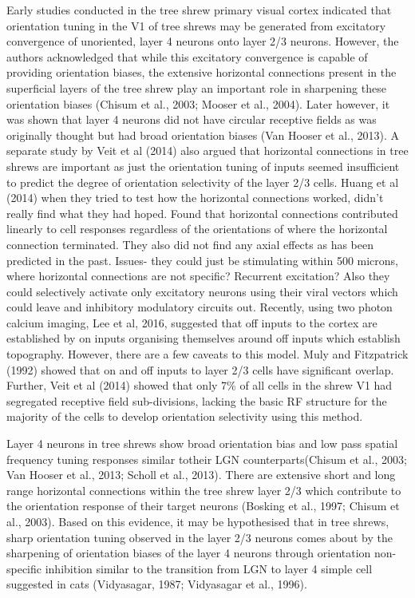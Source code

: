 Early studies conducted in the tree shrew primary visual cortex indicated that orientation tuning in the V1 of tree shrews may be generated from excitatory convergence of unoriented, layer 4 neurons onto layer 2/3 neurons. However, the authors acknowledged that while this excitatory convergence is capable of providing orientation biases, the extensive horizontal connections present in the superficial layers of the tree shrew play an important role in sharpening these orientation biases (Chisum et al., 2003; Mooser et al., 2004). Later however, it was shown that layer 4 neurons did not have circular receptive fields as was originally thought but had broad orientation biases (Van Hooser et al., 2013). A separate study by Veit et al (2014) also argued that horizontal connections in tree shrews are important as just the orientation tuning of inputs seemed insufficient to predict the degree of orientation selectivity of the layer 2/3 cells.
Huang et al (2014) when they tried to test how the horizontal connections worked, didn’t really find what they had hoped. Found that horizontal connections contributed linearly to cell responses regardless of the orientations of where the horizontal connection terminated. They also did not find any axial effects as has been predicted in the past. Issues- they  could just be stimulating within 500 microns, where horizontal connections are not specific? Recurrent excitation? Also they could selectively activate only excitatory neurons using their viral vectors which could leave and inhibitory modulatory circuits out.
Recently, using two photon calcium imaging, Lee et al, 2016, suggested that off inputs to the cortex are established by on inputs organising themselves around off inputs which establish topography. However, there are a few caveats to this model. Muly and Fitzpatrick (1992) showed that on and off inputs to layer 2/3 cells have significant overlap. Further, Veit et al (2014) showed that only 7\% of all cells in the shrew V1 had segregated receptive field sub-divisions, lacking the basic RF structure for the majority of the cells to develop orientation selectivity using this method. 

Layer 4 neurons in tree shrews show broad orientation bias and low pass spatial frequency tuning responses similar totheir LGN counterparts(Chisum et al., 2003; Van Hooser et al., 2013; Scholl et al., 2013). There are extensive short and long range horizontal connections within the tree shrew layer 2/3 which contribute to the orientation response of their target neurons (Bosking et al., 1997; Chisum et al., 2003). Based on this evidence, it may be hypothesised that in tree shrews, sharp orientation tuning observed in the layer 2/3 neurons comes about by the sharpening of orientation biases of the layer 4 neurons through orientation non-specific inhibition similar to the transition from LGN to layer 4 simple cell suggested in cats (Vidyasagar, 1987; Vidyasagar et al., 1996).

